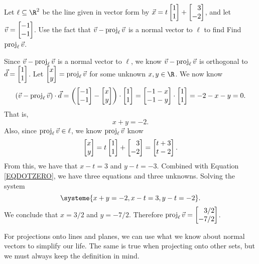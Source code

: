 \begin{example}
	Let $\ell\subseteq \R^2$ be the line given in vector form by $\vec x=t\mat{1\\1}+\mat{3\\-2}$,
	and let $\vec v=\mat{-1\\-1}$. Use the fact that $\vec v-\operatorname{proj}_\ell\vec v$ is a normal vector to $\ell$
	to find Find $\operatorname{proj}_\ell \vec v$.

	Since $\vec v-\operatorname{proj}_\ell\vec v$ is a normal vector to $\ell$, we know $\vec v-\operatorname{proj}_\ell\vec v$ is orthogonal to $\vec d=\mat{1\\1}$. 
	Let $\mat{x\\y}=\Proj_\ell\vec v$ for some unknown $x,y\in\R$. We now know
	\[
		(\vec v-\Proj_\ell\vec v)\cdot\vec d=\left(\mat{-1\\-1}-\mat{x\\y}\right)\cdot\mat{1\\1}
		=\mat{-1-x\\-1-y}\cdot \mat{1\\1}=-2-x-y=0.
	\]
	That is, 
	\begin{equation}
	\label{EQDOTZERO}
	    x+y=-2.
	\end{equation}
	Also, since $\operatorname{proj}_\ell\vec v\in\ell$, we know $\operatorname{proj}_\ell\vec v$ know
	\[
    		\mat{x\\y}=t\mat{1\\1}+\mat{3\\-2}=\mat{t+3\\t-2}.
	\]
	From this, we have that $x-t=3$ and $y-t=-3$. Combined with Equation \eqref{EQDOTZERO}, we have
	three equations and three unknowns. Solving the system
	\[
		\systeme{x+y=-2,x-t=3,y-t=-2}.
	\]
	We conclude that $x=3/2$ and $y=-7/2$. Therefore
	 $\Proj_\ell\vec v = \mat{3/2\\-7/2}$. 
\end{example}

For projections onto lines and planes, we can use what we know about normal vectors to simplify our life.
The same is true when projecting onto other sets, but we must always keep the definition in mind.

